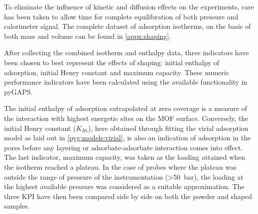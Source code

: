 To eliminate the influence of kinetic and diffusion effects on the 
experiments, care has been taken to allow time for complete equilibration
of both pressure and calorimeter signal.
The complete dataset of adsorption isotherms, on the basis of both mass
and volume can be found in \autoref{appx:shaping}.

After collecting the combined isotherm and enthalpy data, three
indicators have been chosen to best represent the effects of shaping:
initial enthalpy of adsorption, initial Henry constant and maximum capacity.
These numeric performance indicators have been calculated using the
available functionality in pyGAPS.

The initial enthalpy of adsorption extrapolated at zero coverage is
a measure of the interaction with highest energetic sites on the \gls{MOF}
surface. Conversely, the initial Henry constant (\(K_{Hi}\)), here 
obtained through fitting the virial adsorption model as laid out in
\autoref{pyg:models:virial}, is also an indication of adsorption in
the pores before any
layering or adsorbate-adsorbate interaction comes into effect.
The last indicator, maximum capacity, was taken as the loading attained when
the isotherm reached a plateau. In the case of probes where the plateau
was outside the range of pressure of the instrumentation (>\SI{50}{\bar}),
the loading at the highest available pressure was considered as a
suitable approximation.
The three \gls{KPI} have then been compared side by
side on both the powder and shaped samples.





